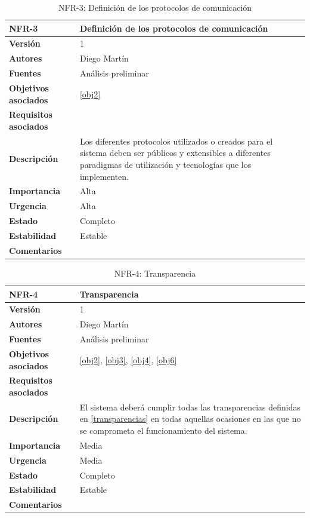 \begin{table}[H]
\centering
\begin{tabular}{|p{3.5cm}|p{10cm}|}
\hline
\textbf{NFR-3} &Definición de los protocolos de comunicación\\
\hline
\textbf{Versión} &1\\
\hline
\textbf{Autores} & Diego Martín\\
\hline
\textbf{Fuentes} &Análisis preliminar\\
\hline
\textbf{Objetivos asociados} & \ref{obj2}\\
\hline
\textbf{Requisitos asociados} &\\
\hline
\textbf{Descripción} &Los diferentes protocolos utilizados o creados para el sistema deben ser públicos y extensibles a diferentes paradigmas de utilización y tecnologías que los implementen.\\
\hline
\textbf{Importancia} &Alta\\
\hline
\textbf{Urgencia} &Alta\\
\hline
\textbf{Estado} &Completo\\
\hline
\textbf{Estabilidad} &Estable\\
\hline
\textbf{Comentarios} &\\
\hline
\end{tabular}
\caption{NFR-3: Definición de los protocolos de comunicación}
\end{table}

\begin{table}[H]
\centering
\begin{tabular}{|p{3.5cm}|p{10cm}|}
\hline
\textbf{NFR-4} &Transparencia\\
\hline
\textbf{Versión} &1\\
\hline
\textbf{Autores} & Diego Martín\\
\hline
\textbf{Fuentes} &Análisis preliminar\\
\hline
\textbf{Objetivos asociados} &\ref{obj2}, \ref{obj3}, \ref{obj4}, \ref{obj6}\\
\hline
\textbf{Requisitos asociados} &\\
\hline
\textbf{Descripción} &El sistema deberá cumplir todas las transparencias definidas en \ref{transparencias} en todas aquellas ocasiones en las que no se comprometa el funcionamiento del sistema.\\
\hline
\textbf{Importancia} &Media\\
\hline
\textbf{Urgencia} &Media\\
\hline
\textbf{Estado} &Completo\\
\hline
\textbf{Estabilidad} &Estable\\
\hline
\textbf{Comentarios} &\\
\hline
\end{tabular}
\caption{NFR-4: Transparencia}
\end{table}

